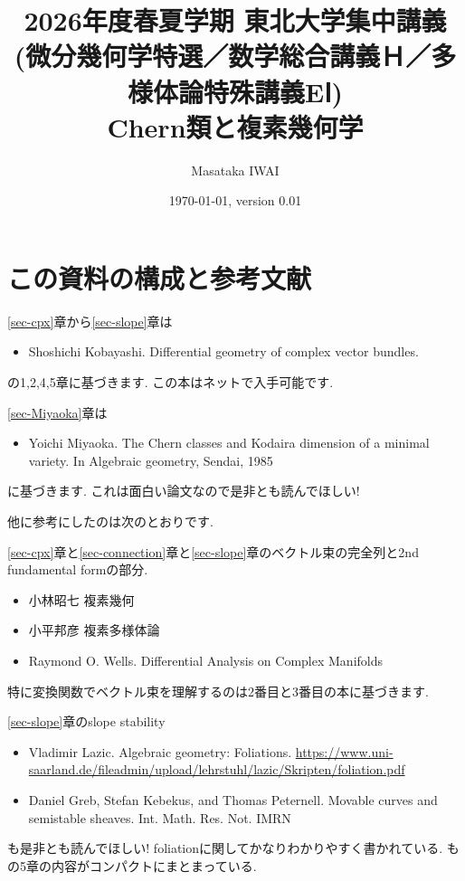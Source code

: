 \documentclass[dvipdfmx,a4paper,11pt]{article} %
\title{2026年度春夏学期 東北大学集中講義 \\ (微分幾何学特選／数学総合講義Ｈ／多様体論特殊講義EⅠ)\\Chern類と複素幾何学}
\author{Masataka IWAI}
\date{\today, version 0.01}
\theoremstyle{definition}
\theoremstyle{remark}
\numberwithin{equation}{section}
\begin{document}
\maketitle
%
\begin{abstract}

\end{abstract}
%
\setcounter{tocdepth}{2}
\tableofcontents


\newpage
\setcounter{section}{-1}
\section{この資料の構成と参考文献}

\ref{sec-cpx}章から\ref{sec-slope}章は
\begin{itemize}
\item \cite{Kob14} Shoshichi Kobayashi. Differential geometry of complex vector bundles. 
\end{itemize}
の1,2,4,5章に基づきます. この本はネットで入手可能です. 

\ref{sec-Miyaoka}章は
\begin{itemize}
\item \cite{Miy87} Yoichi Miyaoka. The Chern classes and Kodaira dimension of a minimal variety.
In Algebraic geometry, Sendai, 1985
\end{itemize}
に基づきます. これは面白い論文なので是非とも読んでほしい!

他に参考にしたのは次のとおりです. 

\ref{sec-cpx}章と\ref{sec-connection}章と\ref{sec-slope}章のベクトル束の完全列と2nd fundamental formの部分.
\begin{itemize}
\item 小林昭七 複素幾何
\item 小平邦彦 複素多様体論
\item Raymond O. Wells. Differential Analysis on Complex Manifolds
\end{itemize}
 特に変換関数でベクトル束を理解するのは2番目と3番目の本に基づきます. 

\ref{sec-slope}章のslope stability
\begin{itemize}
\item \cite{Lazicnote} Vladimir Lazic. Algebraic geometry: Foliations. \url{https://www.uni-saarland.de/fileadmin/upload/lehrstuhl/lazic/Skripten/foliation.pdf}
\item \cite{GKP16a} Daniel Greb, Stefan Kebekus, and Thomas Peternell. Movable curves and semistable sheaves. Int. Math. Res. Not. IMRN
\end{itemize}
\cite{Lazicnote}も是非とも読んでほしい!
foliationに関してかなりわかりやすく書かれている. \cite{GKP16a}も\cite{Kob14}の5章の内容がコンパクトにまとまっている. 
\end{document}
